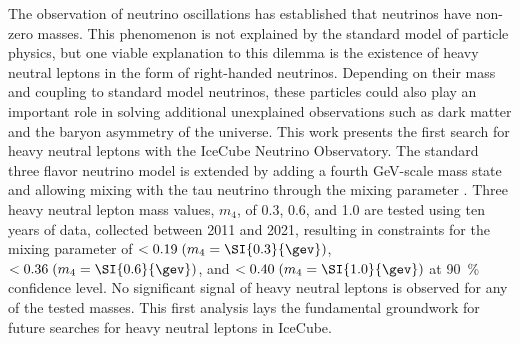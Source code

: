 The observation of neutrino oscillations has established that neutrinos have non-zero masses. This phenomenon is not explained by the standard model of particle physics, but one viable explanation to this dilemma is the existence of heavy neutral leptons in the form of right-handed neutrinos. Depending on their mass and coupling to standard model neutrinos, these particles could also play an important role in solving additional unexplained observations such as dark matter and the baryon asymmetry of the universe. This work presents the first search for heavy neutral leptons with the IceCube Neutrino Observatory. The standard three flavor neutrino model is extended by adding a fourth GeV-scale mass state and allowing mixing with the tau neutrino through the mixing parameter . Three heavy neutral lepton mass values, $m_4$, of \SI{0.3}{\gev}, \SI{0.6}{\gev}, and \SI{1.0}{\gev} are tested using ten years of data, collected between 2011 and 2021, resulting in constraints for the mixing parameter of $ < 0.19\;(m_4 = \SI{0.3}{\gev})$, $ < 0.36\;(m_4 = \SI{0.6}{\gev})$, and $ < 0.40\;(m_4 = \SI{1.0}{\gev})$ at \SI{90}{\percent} confidence level. No significant signal of heavy neutral leptons is observed for any of the tested masses. This first analysis lays the fundamental groundwork for future searches for heavy neutral leptons in IceCube.
